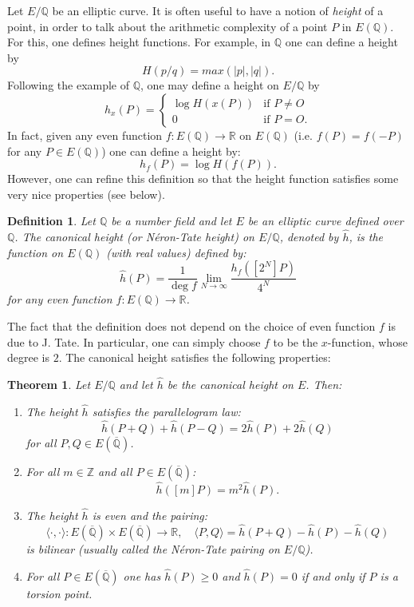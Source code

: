 \documentclass[12pt]{article}
\newtheorem*{thm}{Theorem}
\newtheorem*{defn}{Definition}
\theoremstyle{definition}
\newcommand{\Ints}{\mathbb{Z}}
\newcommand{\Reals}{\mathbb{R}}
\newcommand{\Rats}{\mathbb{Q}}
\begin{document}
Let $E/\Rats$ be an elliptic curve. It is often useful to have a notion of {\it height} of a point, in order to talk about the arithmetic complexity of a point $P$ in $E(\Rats)$. For this, one defines height functions. For example, in $\Rats$ one can define a height by 
$$H(p/q)=max(|p|,|q|).$$
Following the example of $\Rats$, one may define a height on $E/\Rats$ by
$$h_x(P)=\begin{cases}
\log H(x(P)) & \text{if } P\neq O\\
0 & \text{if } P=O.
\end{cases}
$$
In fact, given any even function $f:E(\Rats)\to \Reals$ on $E(\Rats)$ (i.e. $f(P)=f(-P)$ for any $P\in E(\Rats)$) one can define a height by:
$$h_f(P)=\log H(f(P)).$$
However, one can refine this definition so that the height function satisfies some very nice properties (see below).

\begin{defn}
Let $\Rats$ be a number field and let $E$ be an elliptic curve defined over $\Rats$. The canonical height (or N\'eron-Tate height) on $E/\Rats$, denoted by $\hat{h}$, is the function on $E(\Rats)$ (with real values) defined by:
$$\hat{h}(P)=\frac{1}{\deg f} \lim_{N\to \infty} \frac{h_f([2^N]P)}{4^N}$$
for any even function $f:E(\Rats)\to \Reals$.
\end{defn}

The fact that the definition does not depend on the choice of even function $f$ is due to J. Tate. In particular, one can simply choose $f$ to be the $x$-function, whose degree is $2$. The canonical height satisfies the following properties:

\begin{thm}
Let $E/\Rats$ and let $\hat{h}$ be the canonical height on $E$. Then:
\begin{enumerate}
\item The height $\hat{h}$ satisfies the parallelogram law:
$$\hat{h}(P+Q)+\hat{h}(P-Q)=2\hat{h}(P)+2\hat{h}(Q)$$
for all $P,Q \in E(\overline{\Rats})$.

\item For all $m\in \Ints$ and all $P\in E(\overline{\Rats})$:
$$\hat{h}([m]P)=m^2\hat{h}(P).$$

\item The height $\hat{h}$ is even and the pairing:
$$\langle \cdot, \cdot \rangle : E(\overline{\Rats})\times E(\overline{\Rats}) \to \Reals,\quad \langle P,Q \rangle = \hat{h}(P+Q)-\hat{h}(P)-\hat{h}(Q)$$
is bilinear (usually called the N\'eron-Tate pairing on $E/\Rats$).

\item For all $P\in E(\overline{\Rats})$ one has $\hat{h}(P)\geq 0$ and $\hat{h}(P)=0$ if and only if $P$ is a torsion point.
\end{enumerate}
\end{thm}

\end{document}
